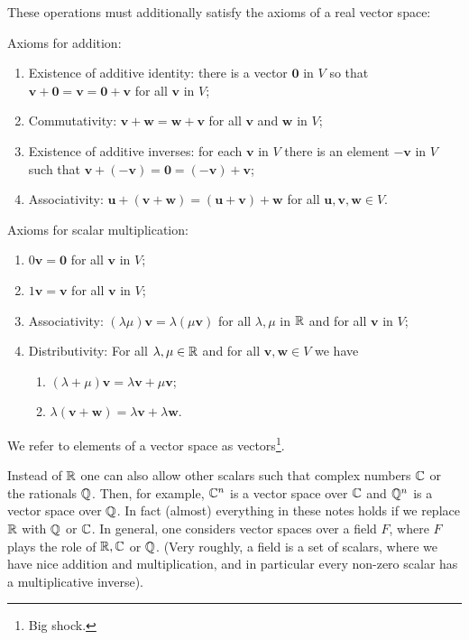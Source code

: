 \documentclass[10pt, a4paper]{article}
\newcommand{\mbf}[1]{\mathbf{#1}}
\begin{document}
These operations must additionally satisfy the axioms of a real vector space:

Axioms for addition:
\begin{enumerate}[label = (\roman*)]
    \item Existence of additive identity:
    there is a vector $\mbf{0}$ in $V$ so that $\mbf{v + 0} = \mbf{v} = \mbf{0 + v}$ for all $\mbf{v}$ in $V$;
    \item Commutativity:
    $\mbf{v + w} = \mbf{w + v}$ for all $\mbf{v}$ and $\mbf{w}$ in $V$;
    \item Existence of additive inverses:
    for each $\mbf{v}$ in $V$ there is an element $-\mbf{v}$ in $V$ such that $\mbf{v} + (-\mbf{v}) = \mbf{0} = (-\mbf{v}) + \mbf{v}$;
    \item Associativity:
    $\mbf{u} + (\mbf{v + w}) = (\mbf{u + v}) + \mbf{w}$ for all $\mbf{u, v, w} \in V$.
\end{enumerate}

Axioms for scalar multiplication:
\begin{enumerate}[label = (\roman*)]
    \item $0\mbf{v} = \mbf{0}$ for all $\mbf{v}$ in $V$;
    \item $1\mbf{v} = \mbf{v}$ for all $\mbf{v}$ in $V$;
    \item Associativity:
    $(\lambda\mu)\mbf{v} = \lambda(\mu\mbf{v})$ for all $\lambda, \mu$ in $\mathbb{R}$ and for all $\mbf{v}$ in $V$;
    \item Distributivity:
    For all $\lambda, \mu \in \mathbb{R}$ and for all $\mbf{v, w} \in V$ we have
    \begin{enumerate}[label = \alph*)]
        \item $(\lambda + \mu)\mbf{v} = \lambda\mbf{v} + \mu\mbf{v}$;
        \item $\lambda(\mbf{v + w}) = \lambda\mbf{v} + \lambda\mbf{w}$.
    \end{enumerate}
\end{enumerate}

We refer to elements of a vector space as vectors\footnote{Big shock.}.

\begin{remark}
    Instead of $\mathbb{R}$ one can also allow other scalars such that complex numbers $\mathbb{C}$ or the rationals $\mathbb{Q}$.
    Then,
    for example,
    $\mathbb{C} ^ n$ is a vector space over $\mathbb{C}$ and $\mathbb{Q} ^ n$ is a vector space over $\mathbb{Q}$.
    In fact
    (almost)
    everything in these notes holds if we replace $\mathbb{R}$ with $\mathbb{Q}$ or $\mathbb{C}$.
    In general,
    one considers vector spaces over a field $F$,
    where $F$ plays the role of $\mathbb{R}, \mathbb{C}$ or $\mathbb{Q}$.
    (Very roughly,
    a field is a set of scalars,
    where we have nice addition and multiplication,
    and in particular every non-zero scalar has a multiplicative inverse).
\end{remark}
\end{document}
